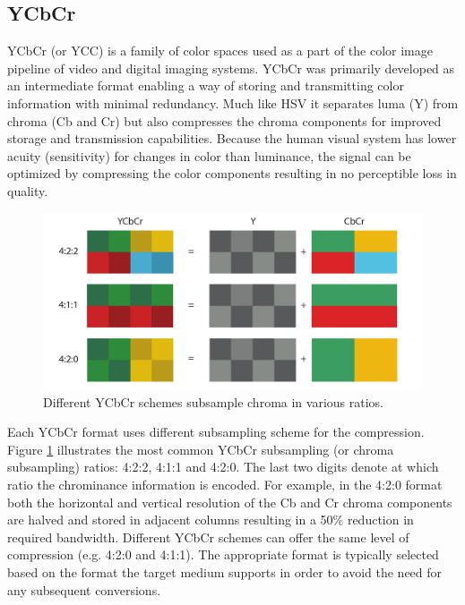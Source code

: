 \documentclass[thesis.tex]{subfiles}
\begin{document}
\subsection{YCbCr}
YCbCr (or YCC) is a family of color spaces used as a part of the color image pipeline of video and digital imaging systems. YCbCr was primarily developed as an intermediate format enabling a way of storing and transmitting color information with minimal redundancy. Much like HSV it separates luma (Y) from chroma (Cb and Cr) but also compresses the chroma components for improved storage and transmission capabilities. Because the human visual system has lower acuity (sensitivity) for changes in color than luminance, the signal can be optimized by compressing the color components resulting in no perceptible loss in quality. \cite{color_vision}

\begin{figure}[ht]
\centering \includegraphics[width=\textwidth]{images/ycbcr}
\caption{Different YCbCr schemes subsample chroma in various ratios.\label{figure:ycbcr}}
\end{figure}

Each YCbCr format uses different subsampling scheme for the compression. Figure \ref{figure:ycbcr} illustrates the most common YCbCr subsampling (or chroma subsampling) ratios: 4:2:2, 4:1:1 and 4:2:0. The last two digits denote at which ratio the chrominance information is encoded. For example, in the 4:2:0 format both the horizontal and vertical resolution of the Cb and Cr chroma components are halved and stored in adjacent columns resulting in a 50\% reduction in required bandwidth. Different YCbCr schemes can offer the same level of compression (e.g. 4:2:0 and 4:1:1). The appropriate format is typically selected based on the format the target medium supports in order to avoid the need for any subsequent conversions.
\end{document}
